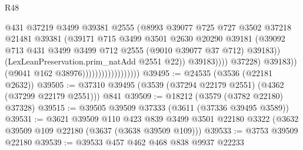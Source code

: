 \begin{lexlean}{R48}
\begin{coremodule}
                                                    @431
                                                    @37219
                                                    @3499
                                                    @39381
                                                    @2555
                                                    (@8993
                                                      @39077
                                                      @725
                                                      @727
                                                      @3502
                                                      @37218
                                                      @21481
                                                      @39381
                                                      (@39171
                                                        @715
                                                        @3499
                                                        @3501
                                                        @2630
                                                        @20290
                                                        @39181
                                                        (@39092
                                                          @713
                                                          @431
                                                          @3499
                                                          @3499
                                                          @712
                                                          @2555
                                                          (@9010 @39077 @37 @712)
                                                          @39183))
                                                      (LexLeanPreservation.prim_natAdd @2551 @22))
                                                    @39183))))
                                            @37228)
                                          @39183))
                                      (@9041 @162 @38976))))))))))))))))))
@39495 := @24535 (@3536 (@22181 @2632))
@39505 := @37310 @39495 (@3539 (@37294 @22179 @2551) (@4362 (@37299 @22179 @2551))) @841
@39509 := @18212 (@3579 (@3782 @22180) @37328)
@39515 := @39505 @39509 @37333 (@3611 (@37336 @39495 @3589))
@39531 := @3621
    @39509
    @110
    @423
    @839
    @3499
    @3501
    @22180
    @3322
    (@3632 @39509 @109 @22180 (@3637 (@3638 @39509 @109)))
@39533 := @3753 @39509 @22180
@39539 := @39533 @457 @462 @468 @838 @9937 @22233

\end{coremodule}
\end{lexlean}
